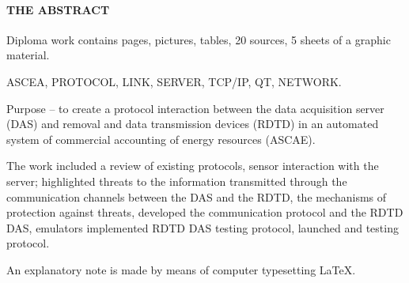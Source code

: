 \newpage
{}
\paragraph*{\hfill THE ABSTRACT \hfill}

Diploma work  contains    pages,    pictures,    tables,  20  sources,  5 sheets of a graphic material.

ASCEA, PROTOCOL, LINK, SERVER, TCP/IP, QT, NETWORK.

Purpose -- to create a protocol interaction between the data acquisition server (DAS) and removal and data transmission devices (RDTD) in an automated system of commercial accounting of energy resources (ASCAE).

The work included a review of existing protocols, sensor interaction with the server; highlighted threats to the information transmitted through the communication channels between the DAS and the RDTD, the mechanisms of protection against threats, developed the communication protocol and the RDTD DAS, emulators implemented RDTD DAS testing protocol, launched and testing protocol. 

An explanatory note is made by means of computer typesetting \LaTeX.